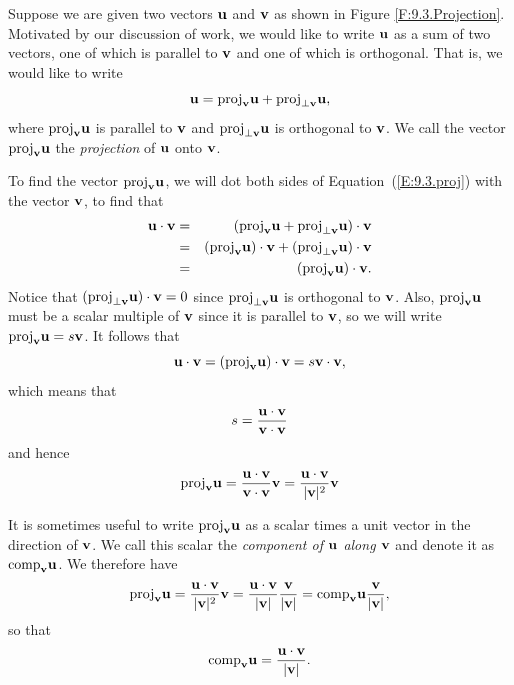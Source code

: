 Suppose we are given two vectors $\mathbf{u}$ and $\mathbf{v}$ as shown in Figure
\ref{F:9.3.Projection}.  Motivated by our discussion of work, we would
like to write $\mathbf{u}$ as a sum of two vectors, one of which is parallel
to $\mathbf{v}$ and one of which is orthogonal.  That is, we would like to
write 
\begin{equation}
  \mathbf{u} = \text{proj}_{\mathbf{v}}\mathbf{u} + \text{proj}_{\perp\mathbf{v}}\mathbf{u},
  \label{E:9.3.proj}
\end{equation}
where $\text{proj}_{\mathbf{v}}\mathbf{u}$ is parallel to $\mathbf{v}$ and $\text{proj}_{\perp\mathbf{v}}\mathbf{u}$
is orthogonal to $\mathbf{v}$.  
We call the vector $\text{proj}_{\mathbf{v}}\mathbf{u}$ the
{\em projection} of $\mathbf{u}$ onto $\mathbf{v}$.

To find the vector $\text{proj}_{\mathbf{v}} \mathbf{u}$, we will dot both sides of Equation~(\ref{E:9.3.proj}) with the vector $\mathbf{v}$, to find that
\begin{eqnarray*}
  \mathbf{u}\cdot\mathbf{v}& = &(\text{proj}_{\mathbf{v}}\mathbf{u} + \text{proj}_{\perp\mathbf{v}}\mathbf{u})\cdot\mathbf{v} \\
                   &=&(\text{proj}_{\mathbf{v}}\mathbf{u})\cdot\mathbf{v} +
  (\text{proj}_{\perp\mathbf{v}}\mathbf{u})\cdot\mathbf{v} \\
                  &=&(\text{proj}_{\mathbf{v}}\mathbf{u})\cdot\mathbf{v}.\\
\end{eqnarray*}
Notice that $(\text{proj}_{\perp\mathbf{v}}\mathbf{u})\cdot\mathbf{v} = 0$ since
$\text{proj}_{\perp\mathbf{v}}\mathbf{u}$ is orthogonal to $\mathbf{v}$.  Also, $\text{proj}_{\mathbf{v}}\mathbf{u}$
must be a scalar multiple of $\mathbf{v}$ since it is parallel to $\mathbf{v}$, so we
will write $\text{proj}_{\mathbf{v}}\mathbf{u} = s\mathbf{v}$.  It follows that
$$
  \mathbf{u}\cdot\mathbf{v} =(\text{proj}_{\mathbf{v}}\mathbf{u})\cdot\mathbf{v} = s\mathbf{v}\cdot\mathbf{v},
$$
which means that
$$
s = \frac{\mathbf{u}\cdot\mathbf{v}}{\mathbf{v}\cdot\mathbf{v}}
$$
and hence
$$
\text{proj}_{\mathbf{v}}\mathbf{u} = \frac{\mathbf{u}\cdot\mathbf{v}}{\mathbf{v}\cdot\mathbf{v}}\mathbf{v} =
\frac{\mathbf{u}\cdot\mathbf{v}}{|\mathbf{v}|^2}\mathbf{v} 
$$

It is sometimes useful to write $\text{proj}_{\mathbf{v}}\mathbf{u}$ as a scalar times a
unit vector in the direction of $\mathbf{v}$.  We call this scalar the
{\em component of $\mathbf{u}$ along $\mathbf{v}$} and denote it as
$\text{comp}_{\mathbf{v}}\mathbf{u}$.  We therefore have
$$
\text{proj}_{\mathbf{v}}\mathbf{u} = \frac{\mathbf{u}\cdot\mathbf{v}}{|\mathbf{v}|^2}\mathbf{v} =
\frac{\mathbf{u}\cdot\mathbf{v}}{|\mathbf{v}|} \frac{\mathbf{v}}{|\mathbf{v}|}=
\text{comp}_{\mathbf{v}}\mathbf{u} \frac{\mathbf{v}}{|\mathbf{v}|},
$$
so that
$$
\text{comp}_{\mathbf{v}}\mathbf{u} = \frac{\mathbf{u}\cdot\mathbf{v}}{|\mathbf{v}|}.
$$

\vspace*{5pt}
\nin {}
\vspace*{5pt}

